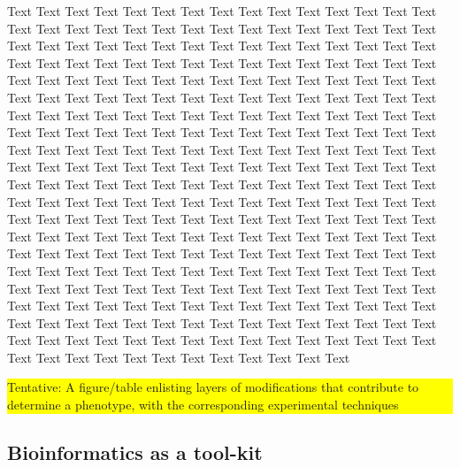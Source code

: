 \documentclass{bioinfo}
\newcommand{\todo}[1]{\colorbox{yellow}{\parbox{1\linewidth}{#1}}}
\begin{document}
Text Text Text Text Text Text  Text Text Text Text Text Text Text Text  Text Text Text Text Text Text Text Text  Text Text Text Text Text Text Text Text  Text Text Text Text Text Text Text Text  Text Text Text Text Text Text Text Text  Text Text Text Text Text Text Text Text  Text Text Text Text Text Text Text Text  Text Text Text Text Text Text Text Text  Text Text Text Text Text Text Text Text  Text Text Text Text Text Text Text Text  Text Text Text Text Text Text Text Text  Text Text Text Text Text Text Text Text  Text Text Text Text Text Text Text Text  Text Text Text Text Text Text Text Text  Text Text Text Text Text Text Text Text  Text Text Text Text Text Text Text Text  Text Text Text Text Text Text Text Text  Text Text Text Text Text Text Text Text  Text Text Text Text Text Text Text Text  Text Text Text Text Text Text Text Text  Text Text Text Text Text Text Text Text  Text Text Text Text Text Text Text Text  Text Text Text Text Text Text Text Text  Text Text Text Text Text Text Text Text  Text Text Text Text Text Text Text Text  Text Text Text Text Text Text Text Text  Text Text Text Text Text Text Text Text  Text Text Text Text Text Text Text Text  Text Text Text Text Text Text Text Text  Text Text Text Text Text Text Text Text  Text Text Text Text Text Text Text Text  Text Text Text Text Text Text Text Text  Text Text Text Text Text Text Text Text  Text Text Text Text Text Text Text Text  Text Text Text Text Text Text Text Text  Text Text Text Text Text Text Text Text  Text Text Text Text Text Text Text Text  Text Text Text Text Text Text Text Text  Text Text 
%
\todo{Tentative: A figure/table enlisting layers of modifications that contribute to determine a phenotype, with the corresponding experimental techniques}
%
%
\subsection{Bioinformatics as a tool-kit}
%
%
%
%
\end{document}
